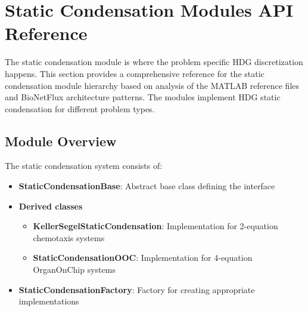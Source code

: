 %

\section{Static Condensation Modules API Reference}
\label{sec:static_condensation_modules_api}

The static condensation module is where the  problem specific HDG discretization happens. This section provides a comprehensive reference for the static condensation module hierarchy based on analysis of the MATLAB reference files and BioNetFlux architecture patterns. The modules implement HDG static condensation for different problem types.

\subsection{Module Overview}

The static condensation system consists of:
\begin{itemize}
    \item \textbf{StaticCondensationBase}: Abstract base class defining the interface
    \item \textbf{Derived classes}
   \begin{itemize}
    \item \textbf{KellerSegelStaticCondensation}: Implementation for 2-equation chemotaxis systems
    \item \textbf{StaticCondensationOOC}: Implementation for 4-equation OrganOnChip systems
   \end{itemize}
    \item \textbf{StaticCondensationFactory}: Factory for creating appropriate implementations
\end{itemize}

%
%
%

